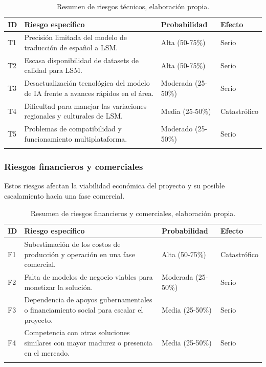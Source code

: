 \begin{longtable}{|>{\centering\arraybackslash}p{0.8cm}|>{\raggedright\arraybackslash}p{3.5cm}|>{\raggedright\arraybackslash}p{5.1cm}|>{\raggedright\arraybackslash}p{5.1cm}|}
	\hline
	\textbf{ID} & \textbf{Riesgo específico} & \textbf{Probabilidad} & \textbf{Efecto} \\
	\hline
	T1 & Precisión limitada del modelo de traducción de español a LSM. & Alta (50-75\%) & Serio \\
	\hline
	T2 & Escasa disponibilidad de datasets de calidad para LSM. & Alta (50-75\%) & Serio \\
	\hline
	T3 & Desactualización tecnológica del modelo de IA frente a avances rápidos en el área. & Moderada (25-50\%) & Serio \\
	\hline
	T4 & Dificultad para manejar las variaciones regionales y culturales de LSM. & Media (25-50\%) & Catastrófico \\
	\hline
	T5 & Problemas de compatibilidad y funcionamiento multiplataforma. & Moderado (25-50\%) & Serio \\
	\hline
\caption[Resumen de riesgos técnicos]{Resumen de riesgos técnicos, elaboración propia.} \label{tab:riesgos_tecnicos_resumen} \\

\end{longtable}

\subsubsection{Riesgos financieros y comerciales}
Estos riesgos afectan la viabilidad económica del proyecto y su posible escalamiento hacia una fase comercial.

\setlength{\tabcolsep}{4pt}
\renewcommand{\arraystretch}{1.2}

\begin{longtable}{|>{\centering\arraybackslash}p{0.8cm}|>{\raggedright\arraybackslash}p{3.5cm}|>{\raggedright\arraybackslash}p{5.1cm}|>{\raggedright\arraybackslash}p{5.1cm}|}
	\hline
	\textbf{ID} & \textbf{Riesgo específico} & \textbf{Probabilidad} & \textbf{Efecto} \\
	\hline
	F1 & Subestimación de los costos de producción y operación en una fase comercial. & Alta (50-75\%) & Catastrófico \\
	\hline
	F2 & Falta de modelos de negocio viables para monetizar la solución. & Moderada (25-50\%) & Serio \\
	\hline
	F3 & Dependencia de apoyos gubernamentales o financiamiento social para escalar el proyecto. & Media (25-50\%) & Serio \\
	\hline
	F4 & Competencia con otras soluciones similares con mayor madurez o presencia en el mercado. & Media (25-50\%) & Serio \\
	\hline

\caption[Resumen de riesgos financieros y comerciales]{Resumen de riesgos financieros y comerciales, elaboración propia.} \label{tab:riesgos_financieros_resumen} \\
\end{longtable}

